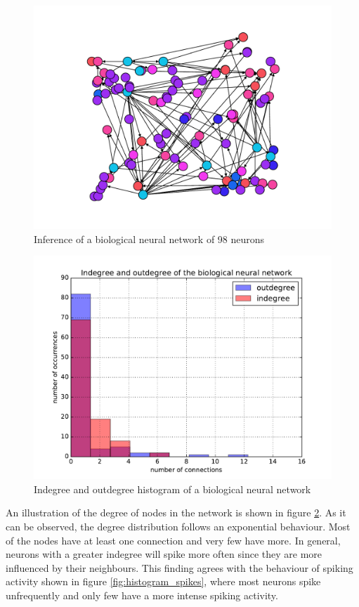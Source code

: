 \begin{figure}
	\centering
	\includegraphics[width=0.8\linewidth]{crcns_4_50_xy.pdf}
	\caption{Inference of a biological neural network of 98 neurons}
	\label{fig:crcns_4_network}
\end{figure}

\begin{figure}
	\centering
	\includegraphics[width=0.8\linewidth]{degree_histogram_real_network.pdf}
	\caption{Indegree and outdegree histogram of a biological neural network}
	\label{fig:degree_histogram}
\end{figure}

An illustration of the degree of nodes in the network is shown in figure \ref{fig:degree_histogram}. As it can be observed, the degree distribution follows an exponential behaviour. Most of the nodes have at least one connection and very few have more. In general, neurons with a greater indegree will spike more often since they are more influenced by their neighbours. This finding agrees with the behaviour of spiking activity shown in figure \ref{fig:histogram_spikes}, where most neurons spike unfrequently and only few have a more intense spiking activity.\\

